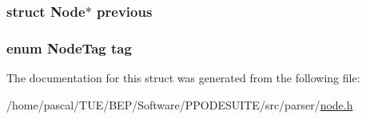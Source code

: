\hypertarget{struct_node_a9a9311efc5dc64017bf492a386b77b0d}{
\subsubsection[{previous}]{\setlength{\rightskip}{0pt plus 5cm}struct {\bf Node}$\ast$ previous}}\label{struct_node_a9a9311efc5dc64017bf492a386b77b0d}
\hypertarget{struct_node_aae55c9a8e76121d7f9c721c0239e6fb8}{
\subsubsection[{tag}]{\setlength{\rightskip}{0pt plus 5cm}enum {\bf Node\-Tag} tag}}\label{struct_node_aae55c9a8e76121d7f9c721c0239e6fb8}


The documentation for this struct was generated from the following file\-:\begin{DoxyCompactItemize}
\item 
/home/pascal/\-T\-U\-E/\-B\-E\-P/\-Software/\-P\-P\-O\-D\-E\-S\-U\-I\-T\-E/src/parser/\hyperlink{node_8h}{node.\-h}\end{DoxyCompactItemize}
